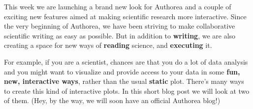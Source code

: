 This week we are launching a brand new look for Authorea and a couple of exciting new features aimed at making scientific research more interactive. Since the very beginning of Authorea, we have been striving to make collaborative scientific writing as easy as possible. But in addition to \textbf{writing}, we are also creating a space for new ways of \textbf{reading} science, and \textbf{executing} it.

For example, if you are a scientist, chances are that you do a lot of data analysis and you might want to visualize and provide access to your data in some \textbf{fun, new, interactive ways}, rather than the usual \textbf{static} plot. There's many ways to create this kind of interactive plots. In this short blog post we will look at two of them. (Hey, by the way, we will soon have an official Authorea blog!)